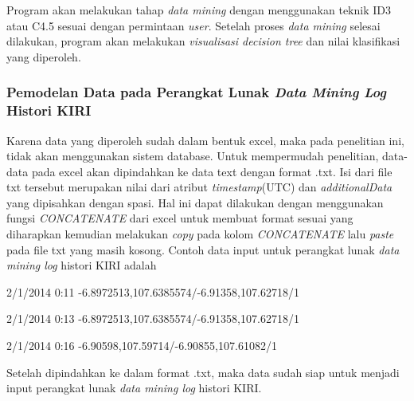 Program akan melakukan tahap \textsl{data mining} dengan menggunakan teknik ID3 atau C4.5 sesuai dengan permintaan \textsl{user}. Setelah proses \textsl{data mining} selesai dilakukan, program akan melakukan \textsl{visualisasi decision tree} dan nilai klasifikasi yang diperoleh.  

\subsubsection{Pemodelan Data pada Perangkat Lunak \textsl{Data Mining Log} Histori KIRI}
Karena data yang diperoleh sudah dalam bentuk excel, maka pada penelitian ini, tidak akan menggunakan sistem database. Untuk mempermudah penelitian, data-data pada excel akan dipindahkan ke data text dengan format .txt. Isi dari file txt tersebut merupakan nilai dari atribut \textsl{timestamp}(UTC) dan \textsl{additionalData} yang dipisahkan dengan spasi. Hal ini dapat dilakukan dengan menggunakan fungsi \textsl{CONCATENATE} dari excel untuk membuat format sesuai yang diharapkan kemudian melakukan \textsl{copy} pada kolom \textsl{CONCATENATE} lalu \textsl{paste} pada file txt yang masih kosong. Contoh data input untuk perangkat lunak \textsl{data mining log} histori KIRI adalah

2/1/2014 0:11 -6.8972513,107.6385574/-6.91358,107.62718/1

2/1/2014 0:13 -6.8972513,107.6385574/-6.91358,107.62718/1

2/1/2014 0:16 -6.90598,107.59714/-6.90855,107.61082/1

Setelah dipindahkan ke dalam format .txt, maka data sudah siap untuk menjadi input perangkat lunak \textsl{data mining log} histori KIRI.

